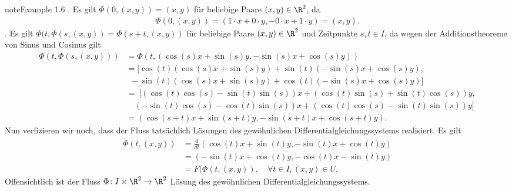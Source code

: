 \documentclass[letterpaper,10pt,german]{jupyterBook}
\begin{document}
\begin{sphinxadmonition}{note}{Example 1.6}
. Es gilt \(\Phi(0, (x,y)) = (x,y)\) für beliebige Paare \((x,y) \in \R^2\), da
\begin{equation*}
\begin{split}\Phi(0, (x,y)) = (1\cdot x + 0\cdot y, - 0 \cdot x + 1 \cdot y) = (x,y).\end{split}
\end{equation*}
. Es gilt \(\Phi(t, \Phi(s,(x,y)) = \Phi(s + t, (x,y))\) für beliebige Paare \((x,y) \in \R^2\) und Zeitpunkte \(s,t \in I\), da wegen der Additionstheoreme von Sinus und Cosinus gilt
\begin{equation*}
\begin{split}\Phi(t, \Phi(s,(x,y))) &= \Phi(t, (\cos(s)x + \sin(s)y, -\sin(s)x + \cos(s)y)) \\
&= [\cos(t)(\cos(s)x + \sin(s)y) + \sin(t)(-\sin(s)x + \cos(s)y), \\
& \ \ -\sin(t)(\cos(s)x + \sin(s)y) + \cos(t)(-\sin(s)x + \cos(s)y)]\\
&= \ [ (\cos(t)\cos(s) - \sin(t)\sin(s))x + (\cos(t)\sin(s) + \sin(t)\cos(s))y, \\
& \quad (-\sin(t)\cos(s) - \cos(t)\sin(s))x + (\cos(t)\cos(s) - \sin(t)\sin(s))y ] \\
&= (\cos(s+t)x + \sin(s+t)y, -\sin(s+t)x + \cos(s+t)y).\end{split}
\end{equation*}
\sphinxAtStartPar
Nun verfizieren wir noch, dass der Fluss tatsächlich Lösungen des gewöhnlichen Differentialgleichungssystems realisiert.
Es gilt
\begin{equation*}
\begin{split}\dot{\Phi}(t, (x,y)) &= \frac{d}{dt}(\cos(t)x + \sin(t)y, -\sin(t)x + \cos(t)y) 
\\&=
(-\sin(t)x + \cos(t)y, -\cos(t)x - \sin(t)y) 
\\&= 
F(\Phi(t,(x,y)), \quad \forall t \in I, (x,y) \in U.\end{split}
\end{equation*}
\sphinxAtStartPar
Offensichtlich ist der Fluss \(\Phi \colon I \times \R^2 \rightarrow \R^2\) Lösung des gewöhnlichen Differentialgleichungssystems.
\end{sphinxadmonition}
\end{document}
